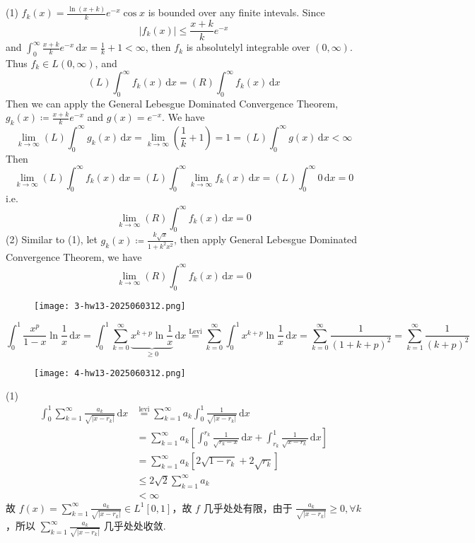 (1) $f_k(x)=\frac{\ln(x+k)}{k}e^{ -x }\cos x$ is bounded over any finite intevals. Since
\[
\lvert f_k(x) \rvert \leq \frac{x+k}{k}e^{ -x }
\]
and $\int_{0}^{\infty} \frac{x+k}{k}e^{ -x } \, \mathrm{d}x=\frac{1}{k}+1<\infty$, then $f_k$ is absolutelyl integrable over $(0,\infty)$. Thus $f_k\in L(0,\infty)$, and
\[
(L)\int_{0}^{\infty} f_k(x) \, \mathrm{d}x =(R)\int_{0}^{\infty} f_k(x) \, \mathrm{d}x
\]
Then we can apply the General Lebesgue Dominated Convergence Theorem, $g_k(x)\coloneqq\frac{x+k}{k}e^{ -x }$ and $g(x)=e^{ -x }$. We have
\[
\lim_{ k \to \infty } (L)\int_{0}^{\infty} g_k(x) \, \mathrm{d}x =\lim_{ k \to \infty } \left( \frac{1}{k}+1 \right)=1=(L)\int_{0}^{\infty} g(x) \, \mathrm{d}x  <\infty
\]
Then
\[
\lim_{ k \to \infty } (L)\int_{0}^{\infty} f_k(x) \, \mathrm{d}x =(L)\int_{0}^{\infty} \lim_{ k \to \infty } f_k(x) \, \mathrm{d}x =(L)\int_{0}^{\infty} 0 \, \mathrm{d}x =0 
\]
i.e.
\[
\lim_{ k \to \infty } (R)\int_{0}^{\infty} f_k(x) \, \mathrm{d}x =0
\]
(2)
Similar to (1), let $g_k(x)\coloneqq\frac{k\sqrt{ x }}{1+k^2x^2}$, then apply General Lebesgue Dominated Convergence Theorem, we have
\[
\lim_{ k \to \infty } (R)\int_{0}^{\infty} f_k(x) \, \mathrm{d}x =0
\]
\begin{exercise}
\begin{figure}[H]
\centering
\texttt{[image: 3-hw13-2025060312.png]}
\label{}
\end{figure}
\end{exercise}
\[
\int_{0}^{1} \frac{x^{p}}{1-x}\ln\frac{1}{x} \, \mathrm{d}x= \int_{0}^{1} \sum_{k=0}^{\infty} \underbrace{ x^{k+p}\ln\frac{1}{x} }_{ \geq 0 } \, \mathrm{d}x \overset{ \text{Levi} }{ = }\sum_{k=0}^{\infty} \int_{0}^{1} x^{k+p}\ln\frac{1}{x} \, \mathrm{d}x =\sum_{k=0}^{\infty } \frac{1}{(1+k+p)^2}=\sum_{k=1}^{\infty} \frac{1}{(k+p)^2}
\]
\begin{exercise}
\begin{figure}[H]
\centering
\texttt{[image: 4-hw13-2025060312.png]}
\label{}
\end{figure}
\end{exercise}
(1)
\[
\begin{aligned}
\int_{0}^{1} \sum_{k=1}^{\infty} \frac{a_k}{\sqrt{ \lvert x-r_k \rvert  }} \, \mathrm{d}x  & \overset{ \text{levi} }{ = }\sum_{k=1}^{\infty}a_k \int_{0}^{1} \frac{1}{\sqrt{ \lvert x-r_k \rvert  }} \, \mathrm{d}x  \\
 & =\sum_{k=1}^{\infty} a_k\left[ \int_{0}^{r_k} \frac{1}{\sqrt{ r_k-x }} \, \mathrm{d}x+\int_{r_k}^{1} \frac{1}{\sqrt{ x-r_k }} \, \mathrm{d}x   \right] \\
 & =\sum_{k=1}^{\infty} a_k\left[ 2 \sqrt{1-r_k}+2 \sqrt{r_k} \right] \\
 & \leq 2\sqrt{ 2 }\sum_{k=1}^{\infty} a_k \\
 & <\infty
\end{aligned}
\]
故 $f (x)=\sum_{k=1}^{\infty}\frac{a_k}{\sqrt{ \lvert x-r_k \rvert }}\in L^{1}[0,1]$，故 $f$ 几乎处处有限，由于 $\frac{a_k}{\sqrt{ \lvert x-r_k \rvert }}\geq0,\forall k$，所以 $\sum_{k=1}^{\infty}\frac{a_k}{\sqrt{ \lvert x-r_k \rvert }}$ 几乎处处收敛.

